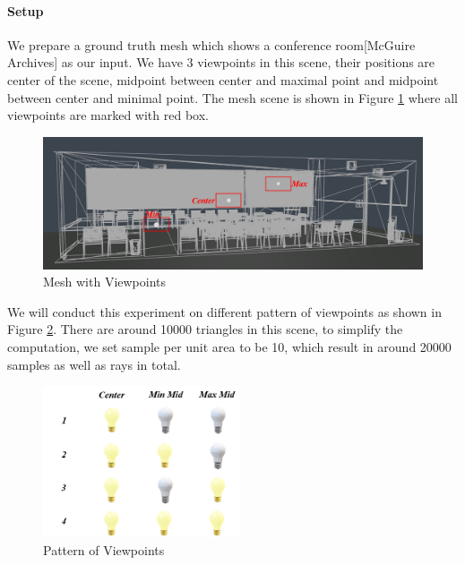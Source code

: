 \documentclass[11pt, a4paper,oneside,chapterprefix=false]{scrbook}
\begin{document}
\paragraph{Setup}

We prepare a ground truth mesh which shows a conference room[McGuire Archives] as our input. We have 3 viewpoints in this scene, their positions are center of the scene, midpoint between center and maximal point and midpoint between center and minimal point. The mesh scene is shown in Figure \ref{fig:mesh with viewpoints} where all viewpoints are marked with red box. 

\vspace{20pt}

\begin{figure}[H]
    \centering
    \includegraphics*[width=1.0\textwidth]{figures/mesh with vps.png}
    \caption{Mesh with Viewpoints}
    \label{fig:mesh with viewpoints}
\end{figure}

\vspace{10pt}

We will conduct this experiment on different pattern of viewpoints as shown in Figure \ref{fig:pattern of viewpoints}. 
There are around 10000 triangles in this scene, to simplify the computation, we set sample per unit area to be 10, which result in around 20000 samples as well as rays in total. 

\begin{figure}[H]
    \centering
    \includegraphics*[width=0.52\textwidth]{figures/pattern of viewpoints.png}
    \caption{Pattern of Viewpoints}
    \label{fig:pattern of viewpoints}
\end{figure}
\end{document}
